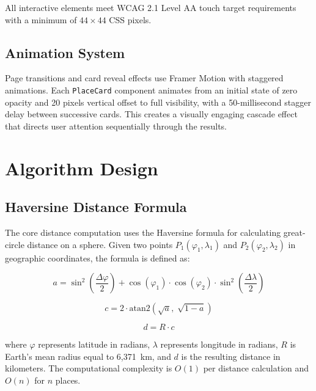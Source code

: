\documentclass[conference]{IEEEtran}
\begin{document}
All interactive elements meet WCAG 2.1 Level AA touch target requirements with a minimum of $44 \times 44$ CSS pixels.

\subsection{Animation System}

Page transitions and card reveal effects use Framer Motion with staggered animations. Each \texttt{PlaceCard} component animates from an initial state of zero opacity and 20 pixels vertical offset to full visibility, with a 50-millisecond stagger delay between successive cards. This creates a visually engaging cascade effect that directs user attention sequentially through the results.

\section{Algorithm Design}

\subsection{Haversine Distance Formula}

The core distance computation uses the Haversine formula for calculating great-circle distance on a sphere. Given two points $P_1(\varphi_1, \lambda_1)$ and $P_2(\varphi_2, \lambda_2)$ in geographic coordinates, the formula is defined as:

\begin{equation}
a = \sin^2\!\left(\frac{\Delta\varphi}{2}\right) + \cos(\varphi_1) \cdot \cos(\varphi_2) \cdot \sin^2\!\left(\frac{\Delta\lambda}{2}\right)
\label{eq:haversine_a}
\end{equation}

\begin{equation}
c = 2 \cdot \text{atan2}\!\left(\sqrt{a},\; \sqrt{1-a}\right)
\label{eq:haversine_c}
\end{equation}

\begin{equation}
d = R \cdot c
\label{eq:haversine_d}
\end{equation}

\noindent where $\varphi$ represents latitude in radians, $\lambda$ represents longitude in radians, $R$ is Earth's mean radius equal to 6{,}371~km, and $d$ is the resulting distance in kilometers. The computational complexity is $O(1)$ per distance calculation and $O(n)$ for $n$ places.
\end{document}
